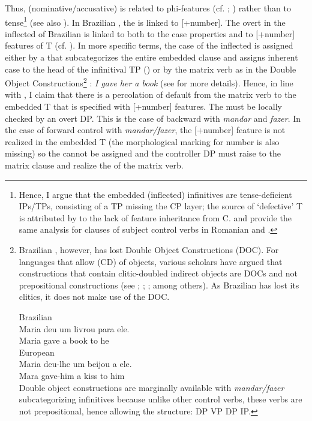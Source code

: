 \documentclass[output=paper]{langsci/langscibook}
\begin{document}
Thus,  (nominative\slash accusative) is related to phi-features (cf. \citealt{George1981}; \citealt{Sitaridou2006}) rather than to tense\footnote{Hence, I argue that the embedded (inflected) infinitives are tense-deficient IPs\slash TPs, consisting of a TP missing the CP layer; the source of ‘defective’ T is attributed by \citet{Chomsky2008} to the lack of feature inheritance from C. \citet{Alboiu2007} and \citet{Alexiadou2010} provide the same analysis for  clauses of subject control verbs in Romanian and .} (see also \citealt{Pires2007}). In Brazilian , the  is linked to [+number]. The overt  in the inflected  of Brazilian  is linked to both to the case properties and to [+number] features of T (cf. \citealt{Nunes1998}). In more specific terms, the case of the inflected  is assigned either by a  that subcategorizes the entire embedded clause and assigns inherent case to the head of the infinitival TP (\citealt{Hornstein2008}) or by the matrix verb as in the Double Object Constructions\footnote{Brazilian , however, has lost Double Object Constructions (DOC). For languages that allow  (CD) of objects, various scholars have argued that constructions that contain clitic-doubled indirect objects are DOCs and not prepositional constructions (see \citealt{Demonte1995}; \citealt{Bleam1999}; \citealt{Anagnostopoulou2003}; among others). As Brazilian  has lost its clitics, it does not make use of the DOC. 

\ea Brazilian \\
    \gll Maria deu   um livrou para ele.   \\
        Maria gave a     book  to      he\\
\z
\ea European  \\
    \gll Maria deu-lhe   um beijou a  ele. \\  
            Mara  gave-him a    kiss    to him\\
\z
Double object constructions are marginally available with \textit{mandar\slash fazer} subcategorizing infinitives because unlike other control verbs, these verbs are not prepositional, hence allowing the structure: DP VP DP IP.} : \textit{I gave her a book} (see \citealt{Larson1991} for more details). Hence, in line with \citet{Raposo1987}, I claim that there is a percolation of default  from the matrix verb to the embedded T that is specified with [+number] features. The  must be locally checked by an overt DP. This is the case of backward  with \textit{mandar} and \textit{fazer}. In the case of forward control with \textit{mandar\slash fazer}, the [+number] feature is not realized in the embedded T (the morphological marking for number is also missing) so the  cannot be assigned and the controller DP must raise to the matrix clause and realize the  of the matrix verb.
\end{document}
